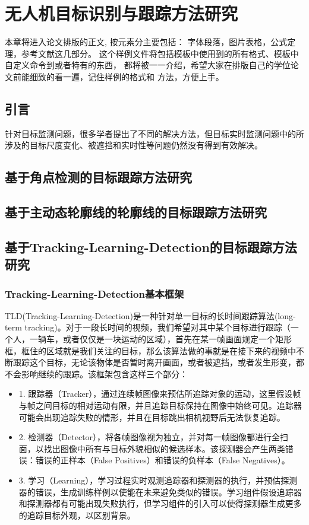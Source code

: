 \chapter{无人机目标识别与跟踪方法研究}
\label{chap:main}
本章将进入论文排版的正文, 按元素分主要包括：
{\kai 字体段落，图片表格，公式定理，参考文献}这几部分。
这个样例文件将包括模板中使用到的所有格式、模板中自定义命令到或者特有的东西，
都将被一一介绍，希望大家在排版自己的学位论文前能细致的看一遍，记住样例的格式和
方法，方便上手。
\cite{ELIDRISSI94}

\section{引言}
针对目标监测问题，很多学者提出了不同的解决方法，但目标实时监测问题中的所涉及的目标尺度变化、被遮挡和实时性等问题仍然没有得到有效解决。


\section{基于角点检测的目标跟踪方法研究}



\section{基于主动态轮廓线的轮廓线的目标跟踪方法研究}



\section{基于Tracking-Learning-Detection的目标跟踪方法研究}
\subsection{Tracking-Learning-Detection基本框架}
TLD(Tracking-Learning-Detection)是一种针对单一目标的长时间跟踪算法(long-term tracking)。对于一段长时间的视频，我们希望对其中某个目标进行跟踪（一个人，一辆车，或者仅仅是一块运动的区域），首先在某一帧画面规定一个矩形框，框住的区域就是我们关注的目标，那么该算法做的事就是在接下来的视频中不断跟踪这个目标，无论该物体是否暂时离开画面，或者被遮挡，或者发生形变，都不会影响继续的跟踪。该框架包含这样三个部分：
\begin{itemize}
	\item 1. 跟踪器（Tracker），通过连续帧图像来预估所追踪对象的运动，这里假设帧与帧之间目标的相对运动有限，并且追踪目标保持在图像中始终可见。追踪器可能会出现追踪失败的情形，并且在目标跳出相机视野后无法恢复追踪。
	\item 2. 检测器（Detector），将各帧图像视为独立，并对每一帧图像都进行全扫面，以找出图像中所有与目标外貌相似的候选样本。该探测器会产生两类错误：错误的正样本（False Positives）和错误的负样本（False Negatives）。
	\item 3. 学习（Learning），学习过程实时观测追踪器和探测器的执行，并预估探测器的错误，生成训练样例以使能在未来避免类似的错误。学习组件假设追踪器和探测器都有可能出现失败执行，但学习组件的引入可以使得探测器生成更多的追踪目标外观，以区别背景。
\end{itemize}
